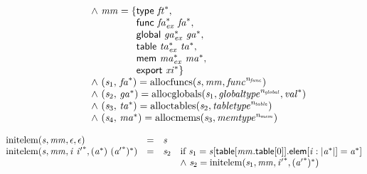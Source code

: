 $$\begin{array}{@{}lcl@{}l@{}}
 &&&\quad {\land}~{\mathit{mm}} = \{ \begin{array}[t]{@{}l@{}}
\mathsf{type}~{{\mathit{ft}}^\ast},\; \\
  \mathsf{func}~{{\mathit{fa}}_{{\mathit{ex}}}^\ast}~{{\mathit{fa}}^\ast},\; \\
  \mathsf{global}~{{\mathit{ga}}_{{\mathit{ex}}}^\ast}~{{\mathit{ga}}^\ast},\; \\
  \mathsf{table}~{{\mathit{ta}}_{{\mathit{ex}}}^\ast}~{{\mathit{ta}}^\ast},\; \\
  \mathsf{mem}~{{\mathit{ma}}_{{\mathit{ex}}}^\ast}~{{\mathit{ma}}^\ast},\; \\
  \mathsf{export}~{{\mathit{xi}}^\ast} \}\end{array} \\
 &&&\quad {\land}~({\mathit{s}}_{{1}},\, {{\mathit{fa}}^\ast}) = {\mathrm{allocfuncs}}({\mathit{s}}, {\mathit{mm}}, {{\mathit{func}}^{{\mathit{n}}_{{\mathit{func}}}}}) \\
 &&&\quad {\land}~({\mathit{s}}_{{2}},\, {{\mathit{ga}}^\ast}) = {\mathrm{allocglobals}}({\mathit{s}}_{{1}}, {{\mathit{globaltype}}^{{\mathit{n}}_{{\mathit{global}}}}}, {{\mathit{val}}^\ast}) \\
 &&&\quad {\land}~({\mathit{s}}_{{3}},\, {{\mathit{ta}}^\ast}) = {\mathrm{alloctables}}({\mathit{s}}_{{2}}, {{\mathit{tabletype}}^{{\mathit{n}}_{{\mathit{table}}}}}) \\
 &&&\quad {\land}~({\mathit{s}}_{{4}},\, {{\mathit{ma}}^\ast}) = {\mathrm{allocmems}}({\mathit{s}}_{{3}}, {{\mathit{memtype}}^{{\mathit{n}}_{{\mathit{mem}}}}}) \\
\end{array}
$$

\vspace{1ex}

$$
\begin{array}{@{}lcl@{}l@{}}
{\mathrm{initelem}}({\mathit{s}}, {\mathit{mm}}, \epsilon, \epsilon) &=& {\mathit{s}} &  \\
{\mathrm{initelem}}({\mathit{s}}, {\mathit{mm}}, {\mathit{i}}~{{\mathit{i}'}^\ast}, ({{\mathit{a}}^\ast})~{({{\mathit{a}'}^\ast})^\ast}) &=& {\mathit{s}}_{{2}} &\quad
  \mbox{if}~{\mathit{s}}_{{1}} = {\mathit{s}}{}[\mathsf{table}{}[{\mathit{mm}}.\mathsf{table}{}[0]].\mathsf{elem}{}[{\mathit{i}} : {|{{\mathit{a}}^\ast}|}] = {{\mathit{a}}^\ast}] \\
 &&&\quad {\land}~{\mathit{s}}_{{2}} = {\mathrm{initelem}}({\mathit{s}}_{{1}}, {\mathit{mm}}, {{\mathit{i}'}^\ast}, {({{\mathit{a}'}^\ast})^\ast}) \\
\end{array}
$$

